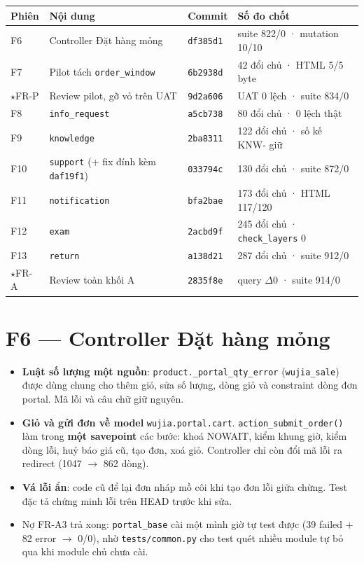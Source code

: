 \begin{center}
\small
\begin{tabular}{llll}
\toprule
Phiên & Nội dung & Commit & Số đo chốt \\
\midrule
F6 & Controller Đặt hàng mỏng & \texttt{df385d1} & suite 822/0 · mutation 10/10 \\
F7 & Pilot tách \texttt{order\_window} & \texttt{6b2938d} & 42 đổi chủ · HTML 5/5 byte \\
$\star$FR-P & Review pilot, gỡ vỏ trên UAT & \texttt{9d2a606} & UAT 0 lệch · suite 834/0 \\
F8 & \texttt{info\_request} & \texttt{a5cb738} & 80 đổi chủ · 0 lệch thật \\
F9 & \texttt{knowledge} & \texttt{2ba8311} & 122 đổi chủ · số kế KNW- giữ \\
F10 & \texttt{support} (+ fix đính kèm \texttt{daf19f1}) & \texttt{033794c} & 130 đổi chủ · suite 872/0 \\
F11 & \texttt{notification} & \texttt{bfa2bae} & 173 đổi chủ · HTML 117/120 \\
F12 & \texttt{exam} & \texttt{2acbd9f} & 245 đổi chủ · \texttt{check\_layers} 0 \\
F13 & \texttt{return} & \texttt{a138d21} & 287 đổi chủ · suite 912/0 \\
$\star$FR-A & Review toàn khối A & \texttt{2835f8e} & query $\Delta$0 · suite 914/0 \\
\bottomrule
\end{tabular}
\end{center}

\section{F6 --- Controller Đặt hàng mỏng}

\begin{itemize}[nosep]
\item \textbf{Luật số lượng một nguồn}: \texttt{product.\_portal\_qty\_error} (\texttt{wujia\_sale}) được dùng chung
  cho thêm giỏ, sửa số lượng, dòng giỏ và constraint dòng đơn portal. Mã lỗi và câu chữ giữ nguyên.
\item \textbf{Giỏ và gửi đơn về model} \texttt{wujia.portal.cart}. \texttt{action\_submit\_order()} làm trong
  \textbf{một savepoint} các bước: khoá NOWAIT, kiểm khung giờ, kiểm dòng lỗi, huỷ báo giá cũ, tạo đơn, xoá giỏ.
  Controller chỉ còn đổi mã lỗi ra redirect (1047 $\to$ 862 dòng).
\item \textbf{Vá lỗi ẩn}: code cũ để lại đơn nháp mồ côi khi tạo đơn lỗi giữa chừng. Test đặc tả chứng minh lỗi
  trên HEAD trước khi sửa.
\item Nợ FR-A3 trả xong: \texttt{portal\_base} cài một mình giờ tự test được (39 failed + 82 error $\to$ 0/0), nhờ
  \texttt{tests/common.py} cho test quét nhiều module tự bỏ qua khi module chủ chưa cài.
\end{itemize}

